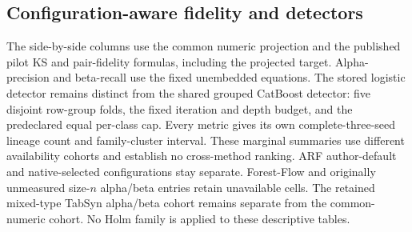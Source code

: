 \documentclass{article}
\begin{document}
\subsection{Configuration-aware fidelity and detectors}
\label{app:wave2fidelity}
The side-by-side columns use the common numeric projection and the published pilot KS and pair-fidelity formulas, including the projected target. Alpha-precision and beta-recall use the fixed unembedded equations. The stored logistic detector remains distinct from the shared grouped CatBoost detector: five disjoint row-group folds, the fixed iteration and depth budget, and the predeclared equal per-class cap. Every metric gives its own complete-three-seed lineage count and family-cluster interval. These marginal summaries use different availability cohorts and establish no cross-method ranking. ARF author-default and native-selected configurations stay separate. Forest-Flow and originally unmeasured size-$n$ alpha/beta entries retain unavailable cells. The retained mixed-type TabSyn alpha/beta cohort remains separate from the common-numeric cohort. No Holm family is applied to these descriptive tables.
\begin{table}[t]
\caption{\textbf{Fidelity and detection by configuration and size.} Median, hierarchical interval, and lineage count in each measured cell. Common-numeric cohorts, with separate availability by metric. Stored logistic AUC and grouped CatBoost AUC have distinct columns. AUC alone establishes neither privacy nor release safety. No Holm family.}
\label{tab:wave2fidelity}
\centering\scriptsize\setlength{\tabcolsep}{2pt}
\resizebox{\linewidth}{!}{}
\end{table}
\begin{table}[t]
\caption{\textbf{Alpha-precision and beta-recall.} Fixed unembedded equations, median over complete sample triples, then hierarchical interval and lineage count. Configuration and cohort are explicit; unavailable cells carry no scalar. The retained TabSyn subset remains separate. No Holm family.}
\label{tab:wave2alpha}
\centering\scriptsize\setlength{\tabcolsep}{2pt}
\resizebox{0.9\linewidth}{!}{}
\end{table}
\end{document}
